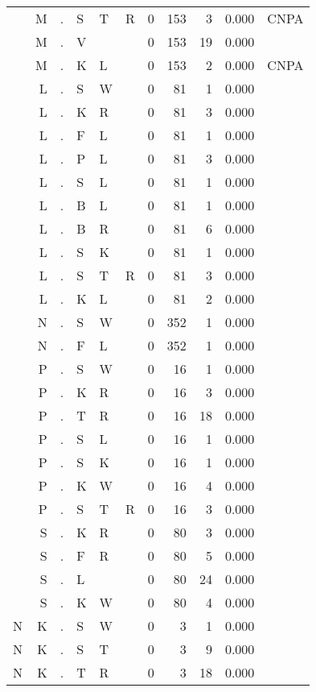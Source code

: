 \begin{longtable}{r@{ } r@{ } c@{ } l@{ } l@{ } l@{ } r r r r l }
  & M & . & S & T & R & 0 & 153 & 3 & 0.000 & \textsc{CNPA} \\
  & M & . & V &   &   & 0 & 153 & 19 & 0.000 &  \\
  & M & . & K & L &   & 0 & 153 & 2 & 0.000 & \textsc{CNPA} \\
  & L & . & S & W &   & 0 & 81 & 1 & 0.000 &  \\
  & L & . & K & R &   & 0 & 81 & 3 & 0.000 &  \\
  & L & . & F & L &   & 0 & 81 & 1 & 0.000 &  \\
  & L & . & P & L &   & 0 & 81 & 3 & 0.000 &  \\
  & L & . & S & L &   & 0 & 81 & 1 & 0.000 &  \\
  & L & . & B & L &   & 0 & 81 & 1 & 0.000 &  \\
  & L & . & B & R &   & 0 & 81 & 6 & 0.000 &  \\
  & L & . & S & K &   & 0 & 81 & 1 & 0.000 &  \\
  & L & . & S & T & R & 0 & 81 & 3 & 0.000 &  \\
  & L & . & K & L &   & 0 & 81 & 2 & 0.000 &  \\
  & N & . & S & W &   & 0 & 352 & 1 & 0.000 &  \\
  & N & . & F & L &   & 0 & 352 & 1 & 0.000 &  \\
  & P & . & S & W &   & 0 & 16 & 1 & 0.000 &  \\
  & P & . & K & R &   & 0 & 16 & 3 & 0.000 &  \\
  & P & . & T & R &   & 0 & 16 & 18 & 0.000 &  \\
  & P & . & S & L &   & 0 & 16 & 1 & 0.000 &  \\
  & P & . & S & K &   & 0 & 16 & 1 & 0.000 &  \\
  & P & . & K & W &   & 0 & 16 & 4 & 0.000 &  \\
  & P & . & S & T & R & 0 & 16 & 3 & 0.000 &  \\
  & S & . & K & R &   & 0 & 80 & 3 & 0.000 &  \\
  & S & . & F & R &   & 0 & 80 & 5 & 0.000 &  \\
  & S & . & L &   &   & 0 & 80 & 24 & 0.000 &  \\
  & S & . & K & W &   & 0 & 80 & 4 & 0.000 &  \\
N & K & . & S & W &   & 0 & 3 & 1 & 0.000 &  \\
N & K & . & S & T &   & 0 & 3 & 9 & 0.000 &  \\
N & K & . & T & R &   & 0 & 3 & 18 & 0.000 &  \\

\end{longtable}
